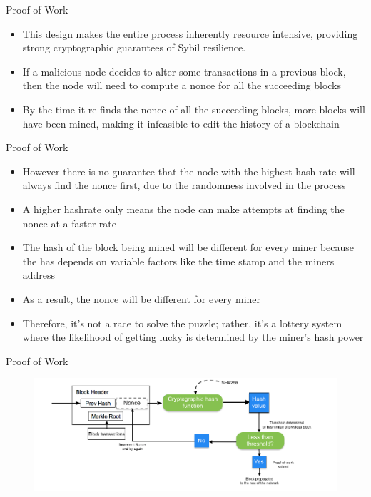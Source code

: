 \documentclass[11pt]{beamer}
\begin{document}

\begin{frame}{Proof of Work}
	\begin{itemize}
		\item This design makes the entire process inherently resource intensive, providing strong cryptographic guarantees of Sybil resilience.
		\item If a malicious node decides to alter some transactions in a previous block, then the node will need to compute a nonce for all the succeeding blocks
		\item By the time it re-finds the nonce of all the succeeding blocks, more blocks will have been mined, making it infeasible to edit the history of a blockchain
	\end{itemize}
\end{frame}


\begin{frame}{Proof of Work}
	\begin{itemize}
		\item However there is no guarantee that the node with the highest hash rate will always find the nonce first, due to the randomness involved in the process
		\item A higher hashrate only means the node can make attempts at finding the nonce at a faster rate
		\item The hash of the block being mined will be different for every miner because the has depends on variable factors like the time stamp and the miners address
		\item As a result, the nonce will be different for every miner
		\item Therefore, it's not a race to solve the puzzle; rather, it's a lottery system where the likelihood of getting lucky is determined by the miner's hash power
	\end{itemize}
\end{frame}


\begin{frame}{Proof of Work}
	\begin{figure}[]
		\centering
		\includegraphics  [scale=0.35]{Images/pow}
	\end{figure}
\end{frame}
\end{document}
